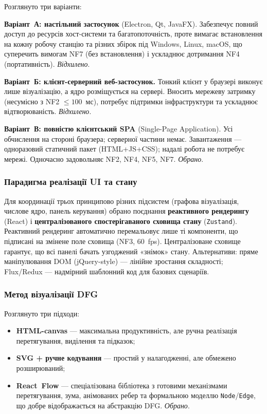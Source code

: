 \documentclass[14pt,a4paper]{extarticle}
\begin{document}
Розглянуто три варіанти:

\textbf{Варіант~А: настільний застосунок} (Electron, Qt, JavaFX).
Забезпечує повний доступ до ресурсів хост-системи та багатопоточність,
проте вимагає встановлення на кожну робочу станцію та різних збірок
під Windows, Linux, macOS, що суперечить вимогам NF7 (без встановлення)
і ускладнює дотримання NF4 (портативність). \emph{Відхилено}.

\textbf{Варіант~Б: клієнт-серверний веб-застосунок.} Тонкий клієнт у
браузері виконує лише візуалізацію, а ядро розміщується на сервері.
Вносить мережеву затримку (несумісно з NF2 $\le 100$~мс), потребує
підтримки інфраструктури та ускладнює відтворюваність. \emph{Відхилено}.

\textbf{Варіант~В: повністю клієнтський SPA} (Single-Page Application).
Усі обчислення на стороні браузера; серверної частини немає.
Завантаження --- одноразовий статичний пакет (HTML+JS+CSS); надалі
робота не потребує мережі. Одночасно задовольняє NF2, NF4, NF5, NF7.
\emph{Обрано}.

\subsubsection*{Парадигма реалізації UI та стану}

Для координації трьох принципово різних підсистем (графова
візуалізація, числове ядро, панель керування) обрано поєднання
\textbf{реактивного рендерингу} (React) і \textbf{централізованого
спостерігаваного сховища стану} (\texttt{Zustand}). Реактивний
рендеринг автоматично перемальовує лише ті компоненти, що підписані
на змінене поле сховища (NF3, 60~fps). Централізоване сховище
гарантує, що всі панелі бачать узгоджений «знімок» стану.
Альтернативи: пряме маніпулювання DOM (jQuery-style) --- лінійне
зростання складності; Flux/Redux --- надмірний шаблонний код для
базових сценаріїв.

\subsubsection*{Метод візуалізації DFG}

Розглянуто три підходи:
\begin{itemize}
  \item \textbf{HTML-canvas} --- максимальна продуктивність, але
        ручна реалізація перетягування, виділення та підказок;
  \item \textbf{SVG + ручне кодування} --- простий у налагодженні,
        але обмежено розширюваний;
  \item \textbf{React~Flow} --- спеціалізована бібліотека з готовими
        механізмами перетягування, зума, анімованих ребер та
        формальною моделлю \texttt{Node}/\texttt{Edge}, що добре
        відображається на абстракцію DFG. \emph{Обрано}.
\end{itemize}
\end{document}
